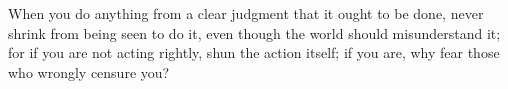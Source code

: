 When you  do anything from  a clear  judgment that it  ought to be  done, never
shrink from being seen to do it, even though the world should misunderstand it;
for if you are not acting rightly, shun the action itself; if you are, why fear
those who wrongly censure you?
